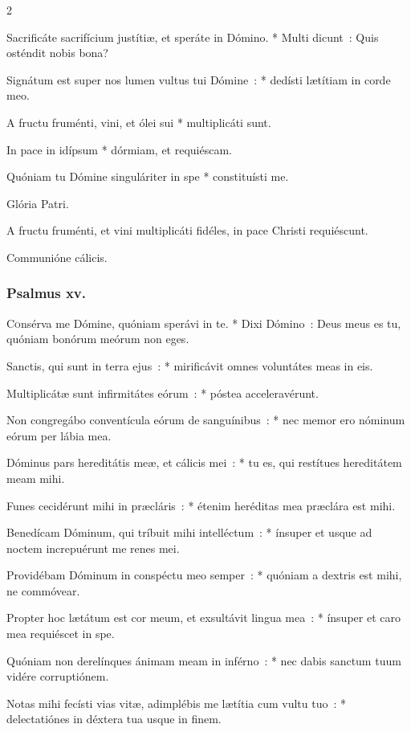 \documentclass[9pt,twoside]{extarticle}
\begin{document}
\begin{multicols}{2}
{Sacrificáte sacrifícium justítiæ, et speráte in Dómino. * Multi dicunt~: Quis osténdit nobis bona?

Signátum est super nos lumen vultus tui Dómine~: * dedísti lætítiam in corde meo.

A fructu fruménti, vini, et ólei sui * multiplicáti sunt.

In pace in idípsum * dórmiam, et requiéscam.

Quóniam tu Dómine singuláriter in spe * constituísti me.

Glória Patri.

\begin{tightlist}{}
\item {} A fructu fruménti, et vini multiplicáti fidéles, in pace Christi requiéscunt.
\item {} Communióne cálicis.
\end{tightlist}
\subsubsection*{\center Psalmus xv.}
\lettrine{C}onsérva me Dómine, quóniam sperávi in te. * Dixi Dómino~: Deus meus es tu, quóniam bonórum meórum non eges.

Sanctis, qui sunt in terra ejus~: * mirificávit omnes voluntátes meas in eis.

Multiplicátæ sunt infirmitátes eórum~: * póstea acceleravérunt.

Non congregábo conventícula eórum de sanguínibus~: * nec memor ero nóminum eórum per lábia mea.

Dóminus pars hereditátis meæ, et cálicis mei~: * tu es, qui restítues hereditátem meam mihi.

Funes cecidérunt mihi in præcláris~: * étenim heréditas mea præclára est mihi.

Benedícam Dóminum, qui tríbuit mihi intelléctum~: * ínsuper et usque ad noctem increpuérunt me renes mei.

Providébam Dóminum in conspéctu meo semper~: * quóniam a dextris est mihi, ne commóvear.

Propter hoc lætátum est cor meum, et exsultávit lingua mea~: * ínsuper et caro mea requiéscet in spe.

Quóniam non derelínques ánimam meam in inférno~: * nec dabis sanctum tuum vidére corruptiónem.

Notas mihi fecísti vias vitæ, adimplébis me lætítia cum vultu tuo~: * delectatiónes in déxtera tua usque in finem.

}
\end{multicols}
\end{document}
